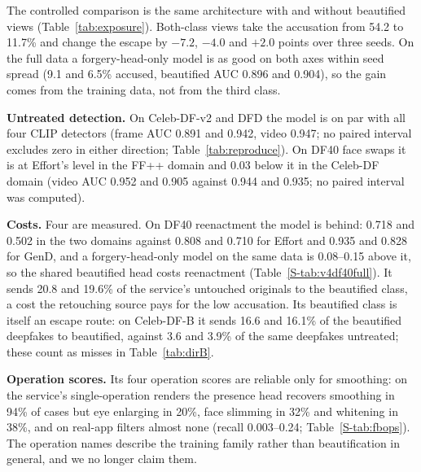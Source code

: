 \documentclass[journal]{IEEEtran}  %
\begin{document}
The controlled comparison is the same architecture with and without
beautified views (Table~\ref{tab:exposure}). Both-class views take the accusation from 54.2 to 11.7\% and change the escape by
$-7.2$, $-4.0$ and $+2.0$ points over three seeds. On the full data a forgery-head-only model is as good on both axes
within seed spread (9.1 and 6.5\% accused, beautified AUC 0.896 and 0.904), so the gain comes from the training data, not
from the third class.

\textbf{Untreated detection.} On Celeb-DF-v2 and DFD the model is on par with all four CLIP detectors (frame AUC 0.891 and
0.942, video 0.947; no paired interval excludes zero in either direction; Table~\ref{tab:reproduce}).
On DF40 face swaps it is at Effort's level in the FF++ domain and
0.03 below it in the Celeb-DF domain (video AUC 0.952 and 0.905 against 0.944 and 0.935; no paired interval was computed).

\textbf{Costs.} Four are measured. On DF40 reenactment the model is behind: 0.718 and 0.502 in the two domains against
0.808 and 0.710 for Effort and 0.935 and 0.828 for GenD, and a forgery-head-only model on the same data is 0.08--0.15 above
it, so the shared beautified head costs reenactment (Table~\ref{S-tab:v4df40full}).
It sends 20.8 and 19.6\% of the service's untouched originals to the beautified class,
a cost the retouching source pays for the low accusation. Its beautified class is itself an escape route: on Celeb-DF-B it
sends 16.6 and 16.1\% of the beautified deepfakes to beautified, against 3.6 and 3.9\% of the same deepfakes untreated; these
count as misses in Table~\ref{tab:dirB}.


\textbf{Operation scores.} Its four operation scores are reliable only for smoothing: on the
service's single-operation renders the presence head recovers smoothing in 94\% of cases but eye
enlarging in 20\%, face slimming in 32\% and whitening in 38\%,
and on real-app filters almost none (recall 0.003--0.24; Table~\ref{S-tab:fbops}).
The operation names describe the training family rather than beautification in general, and we no longer claim them.
\end{document}

